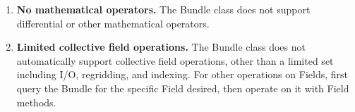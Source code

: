 

\begin{enumerate}
\item{\bf No mathematical operators.}
The Bundle class does not support differential or other
mathematical operators.

\item{\bf Limited collective field operations.}
The Bundle class does not automatically support collective field 
operations, other than a limited set including I/O, regridding, and 
indexing.  For other operations on Fields, first query the Bundle 
for the specific Field desired, then operate on it with Field methods.

\end{enumerate}




